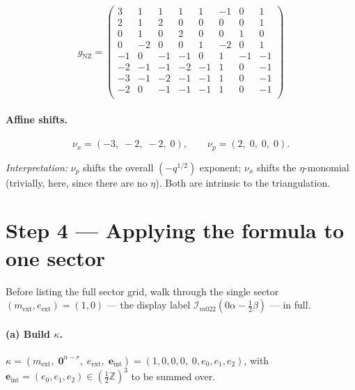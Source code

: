\documentclass[11pt,a4paper]{article}
\renewcommand{\Im}{\mathcal{I}_{m022}}                %
\newcommand{\Zhalf}{\tfrac{1}{2}\mathbb{Z}}
\begin{document}
\[
g_{\text{NZ}} =
\left(\begin{array}{rrrr|rrrr}
 3 &  1 &  1 &  1 &  1 & -1 &  0 &  1 \\
 2 &  1 &  2 &  0 &  0 &  0 &  0 &  1 \\
 0 &  1 &  0 &  2 &  0 &  0 &  1 &  0 \\
 0 & -2 &  0 &  0 &  1 & -2 &  0 &  1 \\ \hline
-1 &  0 & -1 & -1 &  0 &  1 & -1 & -1 \\
-2 & -1 & -1 & -2 & -1 &  1 &  0 & -1 \\
-3 & -1 & -2 & -1 & -1 &  1 &  0 & -1 \\
-2 &  0 & -1 & -1 & -1 &  1 &  0 & -1 \\
\end{array}\right)
\]

\paragraph{Affine shifts.}
\[
\nu_x = (-3,\; -2,\; -2,\; 0), \qquad
\nu_p = ( 2,\; 0,\; 0,\; 0).
\]

\emph{Interpretation:} \(\nu_p\) shifts the overall \((-q^{1/2})\) exponent;
\(\nu_x\) shifts the \(\eta\)-monomial (trivially, here, since there are
no \(\eta\)).  Both are intrinsic to the triangulation.

\section{Step 4 --- Applying the formula to one sector}

Before listing the full sector grid, walk through the single sector
\((m_{\text{ext}}, e_{\text{ext}}) = (1, 0)\) --- the display label
\(\Im\!\left(0\alpha - \tfrac{1}{2}\beta\right)\) --- in full.

\paragraph{(a) Build \(\kappa\).}
\(\kappa = (m_{\text{ext}},\; \mathbf{0}^{n-r},\;
           e_{\text{ext}},\; \mathbf{e}_{\text{int}})
 = (1, 0, 0, 0,\; 0, e_0, e_1, e_2)\),
with \(\mathbf{e}_{\text{int}} = (e_0, e_1, e_2) \in (\Zhalf)^3\) to be
summed over.
\end{document}
